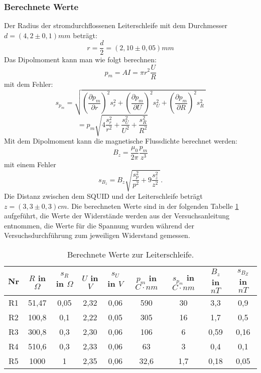 \subsubsection{Berechnete Werte}
Der Radius der stromdurchflossenen Leiterschleife mit dem Durchmesser $d=(4,2\pm0,1)mm$ beträgt:
\[ r=\frac{d}{2}=(2,10\pm0,05)mm \]
Das Dipolmoment kann man wie folgt berechnen:
\[ p_{m}=AI=\pi r^2 \frac{U}{R} \]
mit dem Fehler:
\[ s_{p_m}=\sqrt{\left(\frac{\partial p_m}{\partial r}\right)^2 s_r^2+\left(\frac{\partial p_m}{\partial U}\right)^2 s_U^2+\left(\frac{\partial p_m}{\partial R}\right)^2 s_R^2~}\]
\[ =p_m\sqrt{4\frac{s_r^2}{r^2}+\frac{s_U^2}{U^2}+\frac{s_R^2}{R^2}} ~~~~~~~~~~~~~~~~~~~~~~~\]
Mit dem Dipolmoment kann die magnetische Flussdichte berechnet werden:
\[ B_z=\frac{\mu_0}{2\pi}\frac{p_m}{z^3} \]
mit einem Fehler
\[ s_{B_z}=B_z\sqrt{\frac{s_p^2}{p^2}+9 \frac{s_z^2}{z^2}~} .\]
Die Distanz zwischen dem SQUID und der Leiterschleife beträgt $z=(3,3\pm0,3)cm$.
Die berechneten Werte sind in der folgenden Tabelle \ref{tab:belei} aufgeführt, die Werte der Widerstände werden aus der Versuchsanleitung entnommen, die Werte für die Spannung wurden während der Versuchsdurchführung zum jeweiligen Widerstand gemessen.\\
\begin{table}[h]
\begin{tabular}{c|c|c|c|c|c|c|c|c}\hline
Nr & $R$ in $\Omega$ & $s_R$ in $\Omega$ & $U$ in $V$ & $s_U$ in $V$ & $p_m$ in $C\cdot nm$ & $s_{p_m}$ in $C \cdot nm$ & $B_z$ in $nT$ & $s_{B_Z}$ in $nT$ \\ \hline
R1 & 51,47 & 0,05 & 2,32 & 0,06 & 590 & 30 & 3,3 & 0,9\\
R2 & 100,8 & 0,1 & 2,22 & 0,05 & 305 & 16 & 1,7 & 0,5\\
R3 & 300,8 & 0,3 & 2,30 & 0,06 & 106 & 6 & 0,59 & 0,16\\
R4 & 510,6 & 0,3 & 2,33 & 0,06 & 63 & 3 & 0,4 & 0,1\\
R5 & 1000 & 1 & 2,35 & 0,06 & 32,6 & 1,7 & 0,18 & 0,05 \\ \hline
\end{tabular}
\caption{Berechnete Werte zur Leiterschleife.}
\label{tab:belei}
\end{table}\\~
\clearpage
